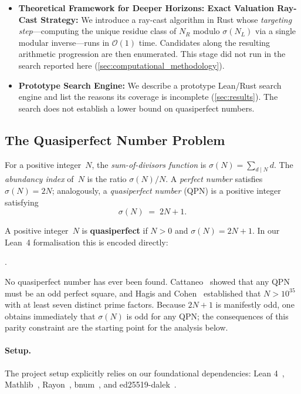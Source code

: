 \begin{itemize}
  \item \textbf{Theoretical Framework for Deeper Horizons: Exact Valuation Ray-Cast Strategy:}
    We introduce a ray-cast algorithm in Rust whose \emph{targeting
    step}---computing the unique residue class of $N_R$ modulo
    $\sigma(N_L)$ via a single modular inverse---runs in
    $\mathcal{O}(1)$ time. Candidates along the resulting arithmetic
    progression are then enumerated.  This stage did not run in the
    search reported here (\cref{sec:computational_methodology}).

  \item \textbf{Prototype Search Engine:}
    We describe a prototype Lean/Rust search engine and list the
    reasons its coverage is incomplete (\cref{sec:results}).  The search
    does not establish a lower bound on quasiperfect numbers.
\end{itemize}


\subsection{The Quasiperfect Number Problem}
\label{sec:qpn_problem}

For a positive integer~$N$, the \emph{sum-of-divisors function} is
$\sigma(N) = \sum_{d \mid N} d$.  The \emph{abundancy index} of~$N$ is
the ratio $\sigma(N)/N$.  A \emph{perfect number} satisfies
$\sigma(N)=2N$; analogously, a \emph{quasiperfect number} (QPN) is a
positive integer satisfying
%
\begin{equation}\label{eq:qpn-def}
  \sigma(N) \;=\; 2N + 1.
\end{equation}

\begin{definition}\label{def:qpn}
  A positive integer~$N$ is \textbf{quasiperfect} if $N > 0$ and
  $\sigma(N) = 2N + 1$.  In our Lean~4 formalisation this is encoded
  directly:
  \begin{center}
    .
  \end{center}
\end{definition}

No quasiperfect number has ever been found.  Cattaneo~\cite{cattaneo1951}
showed that any QPN must be an odd perfect square, and Hagis and
Cohen~\cite{hagis1982} established that $N > 10^{35}$ with at least
seven distinct prime factors.  Because $2N+1$ is manifestly odd, one
obtains immediately that $\sigma(N)$ is odd for any QPN; the
consequences of this parity constraint are the starting point for the
analysis below.

\paragraph{Setup.}
The project setup explicitly relies on our foundational dependencies: Lean 4~\cite{moura2021}, Mathlib~\cite{mathlib2020}, Rayon~\cite{rayon2024}, bnum~\cite{bnum2024}, and ed25519-dalek~\cite{ed25519dalek2024}.
